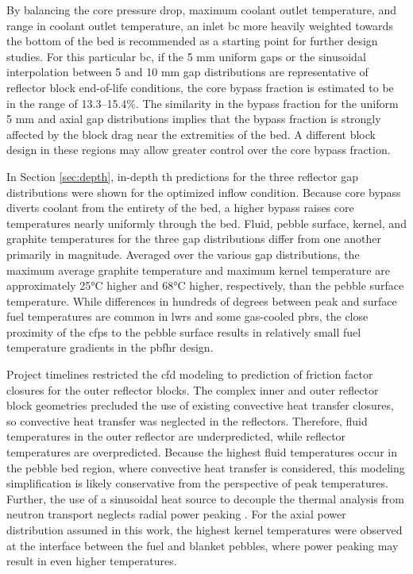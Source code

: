 By balancing the core pressure drop, maximum coolant outlet temperature, and range in coolant outlet temperature, an inlet \gls{bc} more heavily weighted towards the bottom of the bed is recommended as a starting point for further design studies. For this particular \gls{bc}, if the 5 \si{\milli\meter} uniform gaps or the sinusoidal interpolation between 5 and 10 \si{\milli\meter} gap distributions are representative of reflector block end-of-life conditions, the core bypass fraction is estimated to be in the range of 13.3--15.4\%. The similarity in the bypass fraction for the uniform 5 \si{\milli\meter} and axial gap distributions implies that the bypass fraction is strongly affected by the block drag near the extremities of the bed. A different block design in these regions may allow greater control over the core bypass fraction.

In Section \ref{sec:depth}, in-depth \gls{th} predictions for the three reflector gap distributions were shown for the optimized inflow condition. Because core bypass diverts coolant from the entirety of the bed, a higher bypass raises core temperatures nearly uniformly through the bed. Fluid, pebble surface, kernel, and graphite temperatures for the three gap distributions differ from one another primarily in magnitude. Averaged over the various gap distributions, the maximum average graphite temperature and maximum kernel temperature are approximately 25\si{\celsius} higher and 68\si{\celsius} higher, respectively, than the pebble surface temperature. While differences in hundreds of degrees between peak and surface fuel temperatures are common in \glspl{lwr} and some gas-cooled \glspl{pbr}, the close proximity of the \glspl{cfp} to the pebble surface results in relatively small fuel temperature gradients in the \gls{pbfhr} design. 

Project timelines restricted the \gls{cfd} modeling to prediction of friction factor closures for the outer reflector blocks. The complex inner and outer reflector block geometries precluded the use of existing convective heat transfer closures, so convective heat transfer was neglected in the reflectors. Therefore, fluid temperatures in the outer reflector are underpredicted, while reflector temperatures are overpredicted. Because the highest fluid temperatures occur in the pebble bed region, where convective heat transfer is considered, this modeling simplification is likely conservative from the perspective of peak temperatures. Further, the use of a sinusoidal heat source to decouple the thermal analysis from neutron transport neglects radial power peaking \cite{xin_wang_thesis}. For the axial power distribution assumed in this work, the highest kernel temperatures were observed at the interface between the fuel and blanket pebbles, where power peaking may result in even higher temperatures.

